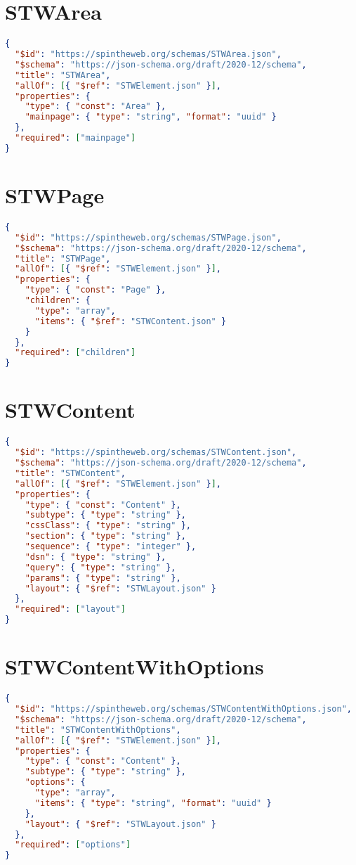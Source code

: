 \section{STWArea}
\begin{lstlisting}[language=JSON,caption={STWArea Schema Definition}]
{
  "$id": "https://spintheweb.org/schemas/STWArea.json",
  "$schema": "https://json-schema.org/draft/2020-12/schema",
  "title": "STWArea",
  "allOf": [{ "$ref": "STWElement.json" }],
  "properties": {
    "type": { "const": "Area" },
    "mainpage": { "type": "string", "format": "uuid" }
  },
  "required": ["mainpage"]
}
\end{lstlisting}

\section{STWPage}
\begin{lstlisting}[language=JSON,caption={STWPage Schema Definition}]
{
  "$id": "https://spintheweb.org/schemas/STWPage.json",
  "$schema": "https://json-schema.org/draft/2020-12/schema",
  "title": "STWPage",
  "allOf": [{ "$ref": "STWElement.json" }],
  "properties": {
    "type": { "const": "Page" },
    "children": {
      "type": "array",
      "items": { "$ref": "STWContent.json" }
    }
  },
  "required": ["children"]
}
\end{lstlisting}

\section{STWContent}
\begin{lstlisting}[language=JSON,caption={STWContent Schema Definition}]
{
  "$id": "https://spintheweb.org/schemas/STWContent.json",
  "$schema": "https://json-schema.org/draft/2020-12/schema",
  "title": "STWContent",
  "allOf": [{ "$ref": "STWElement.json" }],
  "properties": {
    "type": { "const": "Content" },
    "subtype": { "type": "string" },
    "cssClass": { "type": "string" },
    "section": { "type": "string" },
    "sequence": { "type": "integer" },
    "dsn": { "type": "string" },
    "query": { "type": "string" },
    "params": { "type": "string" },
    "layout": { "$ref": "STWLayout.json" }
  },
  "required": ["layout"]
}
\end{lstlisting}

\section{STWContentWithOptions}
\begin{lstlisting}[language=JSON,caption={STWContentWithOptions Schema Definition}]
{
  "$id": "https://spintheweb.org/schemas/STWContentWithOptions.json",
  "$schema": "https://json-schema.org/draft/2020-12/schema",
  "title": "STWContentWithOptions",
  "allOf": [{ "$ref": "STWElement.json" }],
  "properties": {
    "type": { "const": "Content" },
    "subtype": { "type": "string" },
    "options": {
      "type": "array",
      "items": { "type": "string", "format": "uuid" }
    },
    "layout": { "$ref": "STWLayout.json" }
  },
  "required": ["options"]
}
\end{lstlisting}
